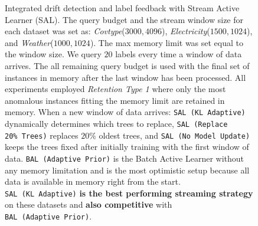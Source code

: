 \documentclass{article} %
\begin{document}
\begin{figure}
	\caption{Integrated drift detection and label feedback with Stream Active Learner (SAL). The query budget and the stream window size for each dataset was set as: \textit{Covtype}($3000, 4096$), \textit{Electricity}($1500, 1024$), and \textit{Weather}($1000, 1024$). The max memory limit was set equal to the window size. We query $20$ labels every time a window of data arrives. The all remaining query budget is used with the final set of instances in memory after the last window has been processed. All experiments employed \textit{Retention Type 1} where only the most anomalous instances fitting the memory limit are retained in memory. When a new window of data arrives: \texttt{SAL~(KL~Adaptive)} dynamically determines which trees to replace, \texttt{SAL~(Replace 20\%~Trees)} replaces $20\%$ oldest trees, and \texttt{SAL~(No~Model~Update)} keeps the trees fixed after initially training with the first window of data. \texttt{BAL~(Adaptive~Prior)} is the Batch Active Learner without any memory limitation and is the most optimistic setup because all data is available in memory right from the start. \texttt{SAL~(KL~Adaptive)} \textbf{is the best performing streaming strategy} on these datasets and \textbf{also competitive} with \texttt{BAL~(Adaptive~Prior)}.} \label{fig:concept_drift_num}
\end{figure}

\end{document}
